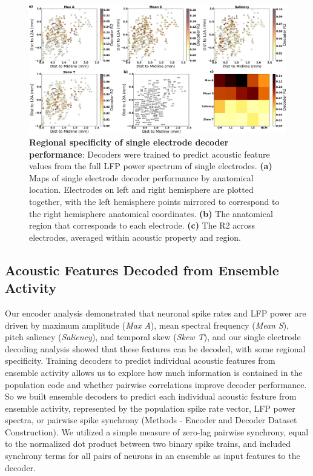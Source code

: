 \begin{figure}
    \caption{\textbf{Regional specificity of single electrode decoder performance}: Decoders were trained to predict acoustic feature values from the full LFP power spectrum of single electrodes. \textbf{(a)} Maps of single electrode decoder performance by anatomical location. Electrodes on left and right hemisphere are plotted together, with the left hemisphere points mirrored to correspond to the right hemisphere anatomical coordinates. \textbf{(b)} The anatomical region that corresponds to each electrode. \textbf{(c)} The R2 across electrodes, averaged within acoustic property and region.
}
    \centering
    \includegraphics[scale=0.25]{figure6.eps}
\end{figure}


\subsection{Acoustic Features Decoded from Ensemble Activity}

Our encoder analysis demonstrated that neuronal spike rates and LFP power are driven by maximum amplitude ({\em Max A}), mean spectral frequency ({\em Mean S}), pitch saliency ({\em Saliency}), and temporal skew ({\em Skew T}), and our single electrode decoding analysis showed that these features can be decoded, with some regional specificity. Training decoders to predict individual acoustic features from ensemble activity allows us to explore how much information is contained in the population code and whether pairwise correlations improve decoder performance. So we built ensemble decoders to predict each individual acoustic feature from ensemble activity, represented by the population spike rate vector, LFP power spectra, or pairwise spike synchrony (Methods - Encoder and Decoder Dataset Construction). We utilized a simple measure of zero-lag pairwise synchrony, equal to the normalized dot product between two binary spike trains, and included synchrony terms for all pairs of neurons in an ensemble as input features to the decoder.

